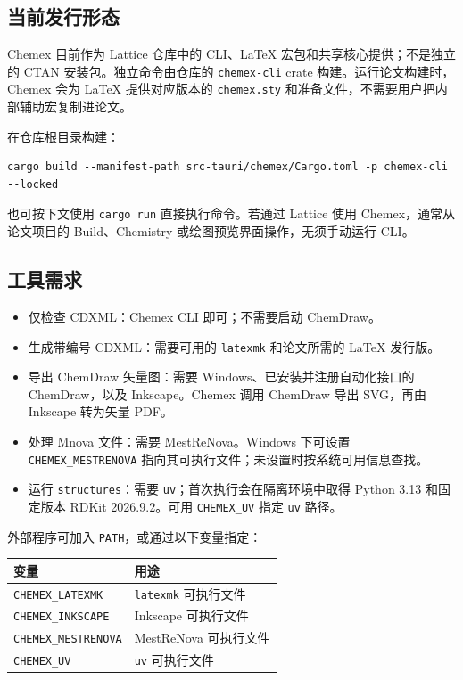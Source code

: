 \documentclass[UTF8,12pt,a4paper]{ctexart}
\begin{document}
\subsection{当前发行形态}

Chemex 目前作为 Lattice 仓库中的 CLI、LaTeX 宏包和共享核心提供；不是独立的 CTAN 安装包。独立命令由仓库的 \texttt{chemex-cli} crate 构建。运行论文构建时，Chemex 会为 LaTeX 提供对应版本的 \texttt{chemex.sty} 和准备文件，不需要用户把内部辅助宏复制进论文。

在仓库根目录构建：

\begin{lstlisting}
cargo build --manifest-path src-tauri/chemex/Cargo.toml -p chemex-cli --locked
\end{lstlisting}

也可按下文使用 \texttt{cargo run} 直接执行命令。若通过 Lattice 使用 Chemex，通常从论文项目的 Build、Chemistry 或绘图预览界面操作，无须手动运行 CLI。

\subsection{工具需求}

\begin{itemize}
  \item 仅检查 CDXML：Chemex CLI 即可；不需要启动 ChemDraw。
  \item 生成带编号 CDXML：需要可用的 \texttt{latexmk} 和论文所需的 LaTeX 发行版。
  \item 导出 ChemDraw 矢量图：需要 Windows、已安装并注册自动化接口的 ChemDraw，以及 Inkscape。Chemex 调用 ChemDraw 导出 SVG，再由 Inkscape 转为矢量 PDF。
  \item 处理 Mnova 文件：需要 MestReNova。Windows 下可设置 \texttt{CHEMEX\_MESTRENOVA} 指向其可执行文件；未设置时按系统可用信息查找。
  \item 运行 \texttt{structures}：需要 \texttt{uv}；首次执行会在隔离环境中取得 Python 3.13 和固定版本 RDKit 2026.9.2。可用 \texttt{CHEMEX\_UV} 指定 \texttt{uv} 路径。
\end{itemize}

外部程序可加入 \texttt{PATH}，或通过以下变量指定：

\begin{center}
\begin{tabular}{ll}
\toprule
变量 & 用途 \\
\midrule
\texttt{CHEMEX\_LATEXMK} & \texttt{latexmk} 可执行文件 \\
\texttt{CHEMEX\_INKSCAPE} & Inkscape 可执行文件 \\
\texttt{CHEMEX\_MESTRENOVA} & MestReNova 可执行文件 \\
\texttt{CHEMEX\_UV} & \texttt{uv} 可执行文件 \\
\bottomrule
\end{tabular}
\end{center}
\end{document}
